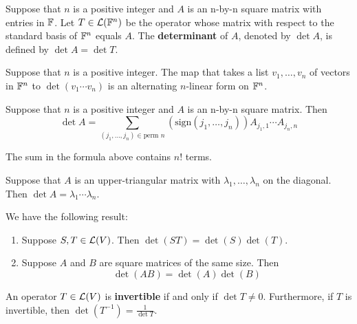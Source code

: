 \documentclass{extarticle}
\begin{document}
\begin{definition}
    Suppose that \(n\) is a positive integer and \(A\) is an n-by-n square matrix with entries in \(\mathbb{F}\). 
    Let \(T \in \mathcal{L}(\mathbb{F}^n)\) be the operator whose matrix with respect to the standard basis of \(\mathbb{F}^n\) 
    equals \(A\). The \textbf{determinant} of \(A\), denoted by \(\det A\), is defined by 
    \(\det A = \det T\).
\end{definition}

\begin{thm}
    Suppose that \(n\) is a positive integer. The map that takes a list \(v_1, \ldots, v_n\) of vectors 
    in \(\mathbb{F}^n\) to \(\det (v_1 \cdots v_n)\) is an alternating \(n\)-linear form on \(\mathbb{F}^n\).
\end{thm}


\begin{corollary}
    Suppose that \(n\) is a positive integer and \(A\) is an n-by-n square matrix. Then 
    \[\det A = \sum_{(j_1, \ldots, j_n) \in \text{perm } n} \left( \text{sign}(j_1, \ldots, j_n) \right) 
    A_{j_1, 1} \cdots A_{j_n, n}\]
\end{corollary}

\begin{remark}
    The sum in the formula above contains \(n!\) terms. 
\end{remark}

\begin{corollary}
    Suppose that \(A\) is an upper-triangular matrix with \(\lambda_1, \ldots, \lambda_n\) on the diagonal. 
    Then \(\det A = \lambda_1 \cdots \lambda_n\). 
\end{corollary}


\begin{thm}
    We have the following result: 
    \begin{enumerate}[label=(\alph*)]
        \item Suppose \(S, T \in \mathcal{L}(V)\). Then \(\det (ST) = \det (S) \det (T)\). 
        \item Suppose \(A\) and \(B\) are square matrices of the same size. Then 
        \[\det (AB) = \det (A) \det (B)\]
    \end{enumerate}
\end{thm}


\begin{corollary}
    An operator \(T \in \mathcal{L}(V)\) is \textbf{invertible} if and only if \(\det T \neq 0\). Furthermore, 
    if \(T\) is invertible, then \(\det (T^{-1}) = \frac{1}{\det T}\).
\end{corollary}
\end{document}
